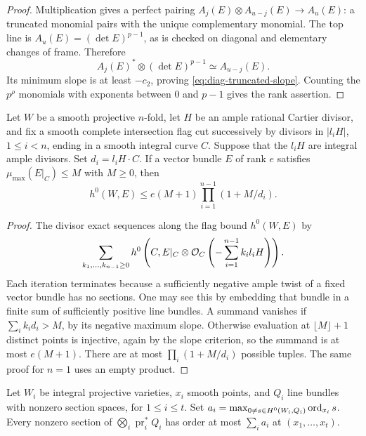 \begin{proof}
Multiplication gives a perfect pairing
$A_j(E)\otimes A_{u-j}(E)\to A_u(E)$: a truncated monomial pairs
with the unique complementary monomial. The top line is
$A_u(E)=(\det E)^{p-1}$, as is checked on diagonal and elementary
changes of frame. Therefore
\[
 A_j(E)^*\otimes(\det E)^{p-1}\simeq A_{u-j}(E).
\]
Its minimum slope is at least $-c_2$, proving
\eqref{eq:diag-truncated-slope}. Counting the $p^\rho$ monomials
with exponents between $0$ and $p-1$ gives the rank assertion.
\end{proof}

\begin{lemma}\label{lem:diag-flag}
Let $W$ be a smooth projective $n$-fold, let $H$ be an ample
rational Cartier divisor, and fix a smooth complete intersection
flag cut successively by divisors in $|l_iH|$, $1\le i<n$, ending
in a smooth integral curve $C$. Suppose that the $l_iH$ are integral
ample divisors. Set $d_i=l_iH\cdot C$. If a vector bundle $E$ of
rank $e$ satisfies $\mu_{\max}(E|_C)\le M$ with $M\ge0$, then
\begin{equation}\label{eq:diag-flag-bound}
 h^0(W,E)\le e(M+1)\prod_{i=1}^{n-1}(1+M/d_i).
\end{equation}
\end{lemma}

\begin{proof}
The divisor exact sequences along the flag bound $h^0(W,E)$ by
\[
 \sum_{k_1,\ldots,k_{n-1}\ge0}
 h^0\left(C,E|_C\otimes
       \mathcal O_C\left(-\sum_{i=1}^{n-1}k_i l_iH\right)\right).
\]
Each iteration terminates because a sufficiently negative ample
twist of a fixed vector bundle has no sections. One may see this
by embedding that bundle in a finite sum of sufficiently positive
line bundles. A summand vanishes if $\sum_i k_i d_i>M$, by its
negative maximum slope. Otherwise evaluation at $\lfloor M\rfloor+1$
distinct points is injective, again by the slope criterion, so the
summand is at most $e(M+1)$. There are at most
$\prod_i(1+M/d_i)$ possible tuples. The same proof for $n=1$
uses an empty product.
\end{proof}

\begin{lemma}\label{lem:diag-orders}
Let $W_i$ be integral projective varieties, $x_i$ smooth points,
and $Q_i$ line bundles with nonzero section spaces, for $1\le i\le t$.
Set $a_i=\max_{0\ne s\in H^0(W_i,Q_i)}\operatorname{ord}_{x_i}s$.
Every nonzero section of $\bigotimes_i\operatorname{pr}_i^*Q_i$
has order at most $\sum_i a_i$ at $(x_1,\ldots,x_t)$.
\end{lemma}

